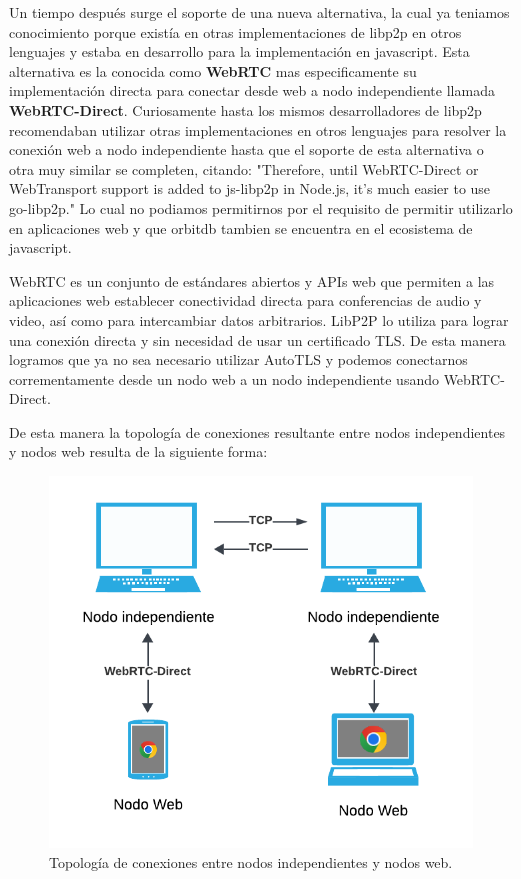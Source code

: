 Un tiempo después surge el soporte de una nueva alternativa, la cual ya teniamos conocimiento porque existía en otras implementaciones de libp2p en otros lenguajes y estaba en desarrollo para la implementación en javascript. Esta alternativa es la conocida como \textbf{WebRTC}\cite{webrtc} mas especificamente su implementación directa para conectar desde web a nodo independiente llamada \textbf{WebRTC-Direct}.  Curiosamente hasta los mismos desarrolladores de libp2p recomendaban utilizar otras implementaciones en otros lenguajes para resolver la conexión web a nodo independiente hasta que el soporte de esta alternativa o otra muy similar se completen, citando: "Therefore, until WebRTC-Direct or WebTransport support is added to js-libp2p in Node.js, it’s much easier to use go-libp2p."\cite{differences-nodejs-browser} Lo cual no podiamos permitirnos por el requisito de permitir utilizarlo en aplicaciones web y que orbitdb tambien se encuentra en el ecosistema de javascript.

WebRTC es un conjunto de estándares abiertos y APIs web que permiten a las aplicaciones web establecer conectividad directa para conferencias de audio y video, así como para intercambiar datos arbitrarios. LibP2P lo utiliza para lograr una conexión directa y sin necesidad de usar un certificado TLS. De esta manera logramos que ya no sea necesario utilizar AutoTLS y podemos conectarnos corrementamente desde un nodo web a un nodo independiente usando WebRTC-Direct.

De esta manera la topología de conexiones resultante entre nodos independientes y nodos web resulta de la siguiente forma: 

\begin{figure}[H]
    \centering
    \includegraphics[width=0.5\linewidth]{img/solucion-ipfs/topologia.png}
    \caption{Topología de conexiones entre nodos independientes y nodos web.}
    \label{fig:bdd-articulos}
\end{figure}

